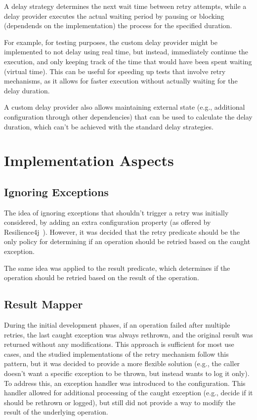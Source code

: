 A delay strategy determines the next wait time between retry attempts,
while a delay provider executes the actual waiting period by pausing or blocking
(dependends on the implementation) the process for the specified duration.

For example, for testing purposes, the custom delay provider might be implemented to not delay using real time,
but instead, immediately continue the execution,
and only keeping track of the time that would have been spent waiting (virtual time).
This can be useful for speeding up tests that involve retry mechanisms,
as it allows for faster execution without actually waiting for the delay duration.

A custom delay provider also allows maintaining external state
(e.g., additional configuration through other dependencies) that can be used to calculate the delay duration,
which can't be achieved with the standard delay strategies.


\section{Implementation Aspects}\label{sec:retry-implementation-aspects}

\subsection{Ignoring Exceptions}\label{subsec:retry-ignoring-exceptions}

The idea of ignoring exceptions that shouldn't trigger a retry was initially considered,
by adding an extra configuration property (as offered by Resilience4j~\cite{resilience4j-retry}).
However, it was decided
that the retry predicate should be the only policy
for determining if an operation should be retried based on the caught exception.

The same idea was applied to the result predicate,
which determines if the operation should be retried based on the result of the operation.

\subsection{Result Mapper}\label{subsec:retry-result-mapper}

During the initial development phases, if an operation failed after multiple retries,
the last caught exception was always rethrown,
and the original result was returned without any modifications.
This approach is sufficient for most use cases,
and the studied implementations of the retry mechanism follow this pattern, but
it was decided to provide a more flexible solution
(e.g., the caller doesn't want a specific exception to be thrown, but instead wants to log it only).
To address this, an exception handler was introduced to the configuration.
This handler allowed for additional processing of the caught exception
(e.g., decide if it should be rethrown or logged),
but still did not provide a way to modify the result of the underlying operation.

